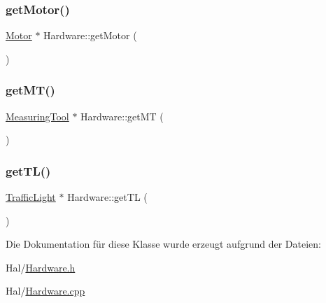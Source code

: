 \hypertarget{class_hardware_a0a896143b14292ea1805d43e384b4fa1}{}\label{class_hardware_a0a896143b14292ea1805d43e384b4fa1} 
\subsubsection{\texorpdfstring{get\+Motor()}{getMotor()}}
{\footnotesize\ttfamily \hyperlink{class_motor}{Motor} $\ast$ Hardware\+::get\+Motor (\begin{DoxyParamCaption}{ }\end{DoxyParamCaption})}

\hypertarget{class_hardware_a6acc1b03b3c39ddbd681058f49e9f1bd}{}\label{class_hardware_a6acc1b03b3c39ddbd681058f49e9f1bd} 
\subsubsection{\texorpdfstring{get\+M\+T()}{getMT()}}
{\footnotesize\ttfamily \hyperlink{class_measuring_tool}{Measuring\+Tool} $\ast$ Hardware\+::get\+MT (\begin{DoxyParamCaption}{ }\end{DoxyParamCaption})}

\hypertarget{class_hardware_a558325fc00a829ca20112234a961b153}{}\label{class_hardware_a558325fc00a829ca20112234a961b153} 
\subsubsection{\texorpdfstring{get\+T\+L()}{getTL()}}
{\footnotesize\ttfamily \hyperlink{class_traffic_light}{Traffic\+Light} $\ast$ Hardware\+::get\+TL (\begin{DoxyParamCaption}{ }\end{DoxyParamCaption})}



Die Dokumentation für diese Klasse wurde erzeugt aufgrund der Dateien\+:\begin{DoxyCompactItemize}
\item 
Hal/\hyperlink{_hardware_8h}{Hardware.\+h}\item 
Hal/\hyperlink{_hardware_8cpp}{Hardware.\+cpp}\end{DoxyCompactItemize}
